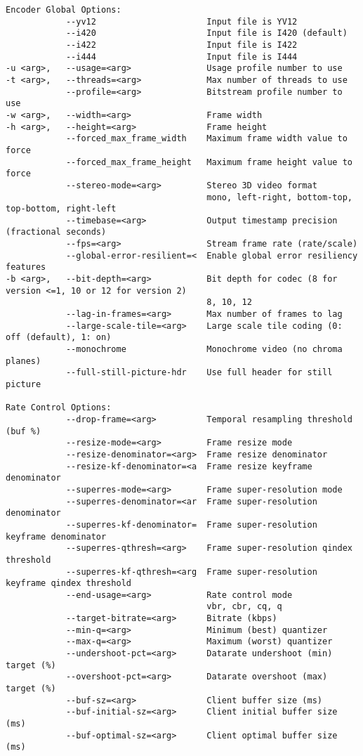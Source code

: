 \begin{appendices}
\begin{lstlisting}
Encoder Global Options:
            --yv12                      Input file is YV12 
            --i420                      Input file is I420 (default)
            --i422                      Input file is I422
            --i444                      Input file is I444
-u <arg>,   --usage=<arg>               Usage profile number to use
-t <arg>,   --threads=<arg>             Max number of threads to use
            --profile=<arg>             Bitstream profile number to use
-w <arg>,   --width=<arg>               Frame width
-h <arg>,   --height=<arg>              Frame height
            --forced_max_frame_width    Maximum frame width value to force
            --forced_max_frame_height   Maximum frame height value to force
            --stereo-mode=<arg>         Stereo 3D video format
                                        mono, left-right, bottom-top, top-bottom, right-left
            --timebase=<arg>            Output timestamp precision (fractional seconds)
            --fps=<arg>                 Stream frame rate (rate/scale)
            --global-error-resilient=<  Enable global error resiliency features
-b <arg>,   --bit-depth=<arg>           Bit depth for codec (8 for version <=1, 10 or 12 for version 2)
                                        8, 10, 12
            --lag-in-frames=<arg>       Max number of frames to lag
            --large-scale-tile=<arg>    Large scale tile coding (0: off (default), 1: on)
            --monochrome                Monochrome video (no chroma planes)
            --full-still-picture-hdr    Use full header for still picture

Rate Control Options:
            --drop-frame=<arg>          Temporal resampling threshold (buf %)
            --resize-mode=<arg>         Frame resize mode
            --resize-denominator=<arg>  Frame resize denominator
            --resize-kf-denominator=<a  Frame resize keyframe denominator
            --superres-mode=<arg>       Frame super-resolution mode
            --superres-denominator=<ar  Frame super-resolution denominator
            --superres-kf-denominator=  Frame super-resolution keyframe denominator
            --superres-qthresh=<arg>    Frame super-resolution qindex threshold
            --superres-kf-qthresh=<arg  Frame super-resolution keyframe qindex threshold
            --end-usage=<arg>           Rate control mode
                                        vbr, cbr, cq, q
            --target-bitrate=<arg>      Bitrate (kbps)
            --min-q=<arg>               Minimum (best) quantizer
            --max-q=<arg>               Maximum (worst) quantizer
            --undershoot-pct=<arg>      Datarate undershoot (min) target (%)
            --overshoot-pct=<arg>       Datarate overshoot (max) target (%)
            --buf-sz=<arg>              Client buffer size (ms)
            --buf-initial-sz=<arg>      Client initial buffer size (ms)
            --buf-optimal-sz=<arg>      Client optimal buffer size (ms)


\end{lstlisting}
\end{appendices}

